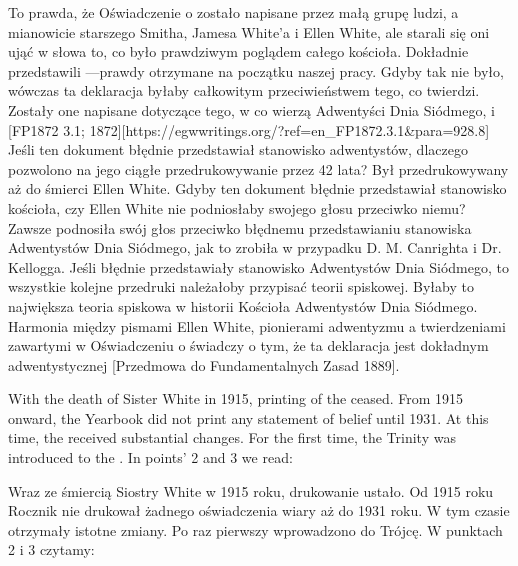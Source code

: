 To prawda, że Oświadczenie o  zostało napisane przez małą grupę ludzi, a mianowicie starszego Smitha, Jamesa White'a i Ellen White, ale starali się oni ująć w słowa to, co było prawdziwym poglądem całego kościoła. Dokładnie przedstawili —prawdy otrzymane na początku naszej pracy. Gdyby tak nie było, wówczas ta deklaracja byłaby całkowitym przeciwieństwem tego, co twierdzi. Zostały one napisane  dotyczące tego, w co wierzą Adwentyści Dnia Siódmego,  i [FP1872 3.1; 1872][https://egwwritings.org/?ref=en\_FP1872.3.1&para=928.8] Jeśli ten dokument błędnie przedstawiał stanowisko adwentystów, dlaczego pozwolono na jego ciągłe przedrukowywanie przez 42 lata? Był przedrukowywany aż do śmierci Ellen White. Gdyby ten dokument błędnie przedstawiał stanowisko kościoła, czy Ellen White nie podniosłaby swojego głosu przeciwko niemu? Zawsze podnosiła swój głos przeciwko błędnemu przedstawianiu stanowiska Adwentystów Dnia Siódmego, jak to zrobiła w przypadku D. M. Canrighta i Dr. Kellogga. Jeśli  błędnie przedstawiały stanowisko Adwentystów Dnia Siódmego, to wszystkie kolejne przedruki należałoby przypisać teorii spiskowej. Byłaby to największa teoria spiskowa w historii Kościoła Adwentystów Dnia Siódmego. Harmonia między pismami Ellen White, pionierami adwentyzmu a twierdzeniami zawartymi w Oświadczeniu o  świadczy o tym, że ta deklaracja jest dokładnym  adwentystycznej [Przedmowa do Fundamentalnych Zasad 1889].


With the death of Sister White in 1915, printing of the  ceased. From 1915 onward, the Yearbook did not print any statement of belief until 1931. At this time, the  received substantial changes. For the first time, the Trinity was introduced to the . In points’ 2 and 3 we read:


Wraz ze śmiercią Siostry White w 1915 roku, drukowanie  ustało. Od 1915 roku Rocznik nie drukował żadnego oświadczenia wiary aż do 1931 roku. W tym czasie  otrzymały istotne zmiany. Po raz pierwszy wprowadzono do  Trójcę. W punktach 2 i 3 czytamy:



